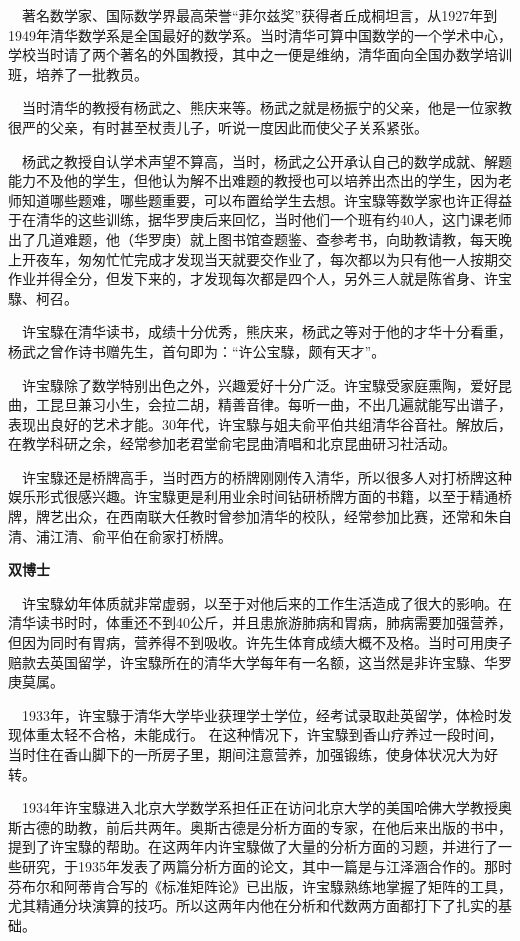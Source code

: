 \begin{frame}
	$\quad$著名数学家、国际数学界最高荣誉“菲尔兹奖”获得者丘成桐坦言，从1927年到1949年清华数学系是全国最好的数学系。当时清华可算中国数学的一个学术中心，学校当时请了两个著名的外国教授，其中之一便是维纳，清华面向全国办数学培训班，培养了一批教员。

	$\quad$当时清华的教授有杨武之、熊庆来等。杨武之就是杨振宁的父亲，他是一位家教很严的父亲，有时甚至杖责儿子，听说一度因此而使父子关系紧张。
	
	$\quad$杨武之教授自认学术声望不算高，当时，杨武之公开承认自己的数学成就、解题能力不及他的学生，但他认为解不出难题的教授也可以培养出杰出的学生，因为老师知道哪些题难，哪些题重要，可以布置给学生去想。许宝騄等数学家也许正得益于在清华的这些训练，据华罗庚后来回忆，当时他们一个班有约40人，这门课老师出了几道难题，他（华罗庚）就上图书馆查题鉴、查参考书，向助教请教，每天晚上开夜车，匆匆忙忙完成才发现当天就要交作业了，每次都以为只有他一人按期交作业并得全分，但发下来的，才发现每次都是四个人，另外三人就是陈省身、许宝騄、柯召。
	
\end{frame}

\begin{frame}
	$\quad$许宝騄在清华读书，成绩十分优秀，熊庆来，杨武之等对于他的才华十分看重，杨武之曾作诗书赠先生，首句即为：“许公宝騄，颇有天才”。

	$\quad$许宝騄除了数学特别出色之外，兴趣爱好十分广泛。许宝騄受家庭熏陶，爱好昆曲，工昆旦兼习小生，会拉二胡，精善音律。每听一曲，不出几遍就能写出谱子，表现出良好的艺术才能。30年代，许宝騄与姐夫俞平伯共组清华谷音社。解放后，在教学科研之余，经常参加老君堂俞宅昆曲清唱和北京昆曲研习社活动。
	
	$\quad$许宝騄还是桥牌高手，当时西方的桥牌刚刚传入清华，所以很多人对打桥牌这种娱乐形式很感兴趣。许宝騄更是利用业余时间钻研桥牌方面的书籍，以至于精通桥牌，牌艺出众，在西南联大任教时曾参加清华的校队，经常参加比赛，还常和朱自清、浦江清、俞平伯在俞家打桥牌。
\end{frame}

\begin{frame}
	\textbf{双博士}
	
	$\quad$许宝騄幼年体质就非常虚弱，以至于对他后来的工作生活造成了很大的影响。在清华读书时时，体重还不到40公斤，并且患旅游肺病和胃病，肺病需要加强营养，但因为同时有胃病，营养得不到吸收。许先生体育成绩大概不及格。当时可用庚子赔款去英国留学，许宝騄所在的清华大学每年有一名额，这当然是非许宝騄、华罗庚莫属。
	
	$\quad$1933年，许宝騄于清华大学毕业获理学士学位，经考试录取赴英留学，体检时发现体重太轻不合格，未能成行。
	在这种情况下，许宝騄到香山疗养过一段时间，当时住在香山脚下的一所房子里，期间注意营养，加强锻练，使身体状况大为好转。
	
	$\quad$1934年许宝騄进入北京大学数学系担任正在访问北京大学的美国哈佛大学教授奥斯古德的助教，前后共两年。奥斯古德是分析方面的专家，在他后来出版的书中，提到了许宝騄的帮助。在这两年内许宝騄做了大量的分析方面的习题，并进行了一些研究，于1935年发表了两篇分析方面的论文，其中一篇是与江泽涵合作的。那时芬布尔和阿蒂肯合写的《标准矩阵论》已出版，许宝騄熟练地掌握了矩阵的工具，尤其精通分块演算的技巧。所以这两年内他在分析和代数两方面都打下了扎实的基础。
\end{frame}

